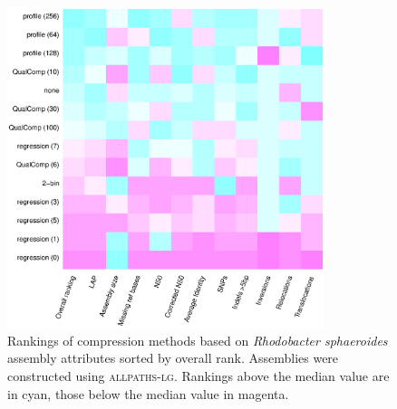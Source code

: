 \documentclass{bioinfo}
\begin{document}
\begin{figure}[!tbp]
\centerline{\includegraphics[width=3.65in]{rhodo_assembly_results.eps}}
\caption{Rankings of compression methods based on \textit{Rhodobacter
    sphaeroides} assembly attributes sorted by overall
  rank. Assemblies were constructed using \textsc{allpaths-lg}.
  Rankings above the median value are in cyan, those below the median
  value in magenta.}
  \label{fig:assembly_ranks}
\end{figure}
\end{document}
